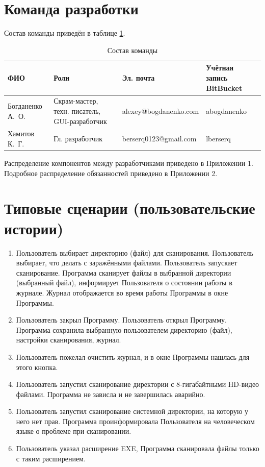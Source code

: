 \section{Команда разработки}
Состав команды приведён в таблице \ref{table:team}.
\begin{table}[h]
\centering
\begin{tabular}{|p{25mm}|p{35mm}|l|p{25mm}|}
\hline
ФИО & Роли & Эл. почта & Учётная запись BitBucket \\
\hline
Богданенко А.~О. & Скрам-мастер, техн. писатель, GUI-разработчик & alexey@bogdanenko.com & abogdanenko \\
\hline
Хамитов К.~Г. & Гл. разработчик & berserq0123@gmail.com & lberserq \\
\hline
\end{tabular}
\caption{Состав команды}
\label{table:team}
\end{table}
Распределение компонентов между разработчиками приведено в Приложении 1. Подробное распределение обязанностей приведено в Приложении 2.
\section{Типовые сценарии (пользовательские истории)}
\begin{enumerate}
\item Пользователь выбирает директорию (файл) для сканирования. Пользователь выбирает, что делать с заражёнными файлами. Пользователь запускает сканирование. Программа сканирует файлы в выбранной директории (выбранный файл), информирует Пользователя о состоянии работы в журнале. Журнал отображается во время работы Программы в окне Программы.
\item Пользователь закрыл Программу. Пользователь открыл Программу. Программа сохранила выбранную пользователем директорию (файл), настройки сканирования, журнал.
\item Пользователь пожелал очистить журнал, и в окне Программы нашлась для этого кнопка.
\item Пользователь запустил сканирование директории с 8-гигабайтными HD-видео файлами. Программа не зависла и не завершилась аварийно.
\item Пользователь запустил сканирование системной директории, на которую у него нет прав. Программа проинформировала Пользователя на человеческом языке о проблеме при сканировании.
\item Пользователь указал расширение EXE, Программа сканировала файлы только с таким расширением.
\end{enumerate}
